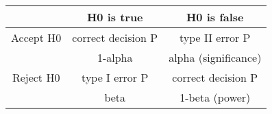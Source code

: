 %
%
%

%
%
%

%
%

\begin{center}
\begin{tabular}{|c|c|c|} \hline
& H0 is true &  H0 is false \\ \hline 
Accept H0& correct decision P & type II error P \\ 
& 1-alpha& alpha (significance)\\\hline 
Reject H0& type I error P & correct decision P \\
&beta&1-beta (power)\\ \hline
\end{tabular} 
\end{center}


